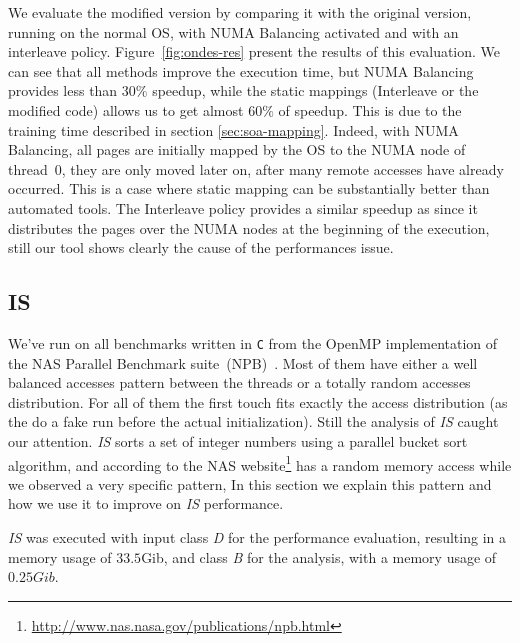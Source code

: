 We evaluate the modified version by comparing it with the original
version, running on the normal OS, with NUMA Balancing activated and with an
interleave policy. Figure~\ref{fig:ondes-res} present the results of this
evaluation. We can see that all methods improve the execution time, but
NUMA Balancing provides less than $30\%$ speedup, while the static mappings
(Interleave or the modified code) allows us to get almost $60\%$ of speedup. This is
due to the training time described in section \ref{sec:soa-mapping}. Indeed,
with NUMA Balancing, all pages are initially mapped by the OS to the NUMA node
of thread~$0$, they
are only moved later on, after many remote accesses have already occurred. This is a case where static mapping can be substantially better than automated
tools. The Interleave policy provides a similar speedup as
\TABARNAC since it distributes the pages over the NUMA nodes at the beginning of
the execution, still our tool shows clearly the cause of the performances issue.


\subsection{IS}
\label{sec:exp-is}


We've run \TABARNAC on all benchmarks written in \texttt{C} from the OpenMP
implementation of the NAS Parallel Benchmark suite~(NPB)~\cite{Jin1999}. Most
of them have either a well balanced accesses pattern between the threads or a
totally random accesses distribution. For all of them the first touch fits exactly
the access distribution (as the do a fake run before the actual
initialization). Still the analysis of \emph{IS} caught our attention.
\emph{IS} sorts a set of integer numbers using a parallel bucket sort
algorithm, and according to the NAS
website\footnote{\url{http://www.nas.nasa.gov/publications/npb.html}} has a
random memory access while we observed a very specific pattern, In this
section we explain this pattern and how we use it to improve on \emph{IS}
performance.

\emph{IS} was executed with input class \emph{D} for the performance
evaluation, resulting in a memory usage of $33.5$Gib, and class \emph{B} for
the analysis, with a memory usage of $0.25Gib$.


